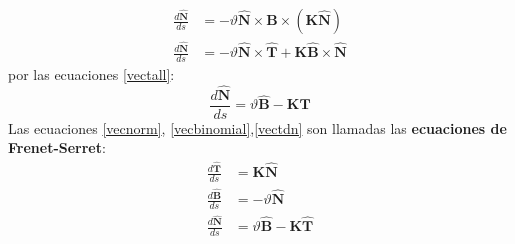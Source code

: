 \documentclass[a4paper]{article}
\begin{document}
\begin{align*}
\frac{d\mathbf{\hat{N}}}{ds}&=-\vartheta\mathbf{\hat{N}}\times\mathbf{\hat{B}}\times(\mathbf{K}\mathbf{\hat{N}})\\
\frac{d\mathbf{\hat{N}}}{ds}&=-\vartheta\mathbf{\hat{N}}\times\mathbf{\hat{T}}+\mathbf{K}\mathbf{\hat{B}}\times\mathbf{\hat{N}}
\end{align*}
por las ecuaciones \ref{vectall}:
\begin{equation}
\label{vectdn}
\frac{d\mathbf{\hat{N}}}{ds}=\vartheta\mathbf{\hat{B}}-\mathbf{K}\mathbf{\hat{T}}
\end{equation}
Las ecuaciones \ref{vecnorm}, \ref{vecbinomial},\ref{vectdn} son llamadas las \textbf{ecuaciones de Frenet-Serret}:
\begin{align*}
\frac{d\mathbf{\hat{T}}}{ds}&=\mathbf{K}\mathbf{\hat{N}}\\
\frac{d\mathbf{\hat{B}}}{ds}&=-\vartheta\mathbf{\hat{N}}\\
\frac{d\mathbf{\hat{N}}}{ds}&=\vartheta\mathbf{\hat{B}}-\mathbf{K}\mathbf{\hat{T}}
\end{align*}
\end{document}

